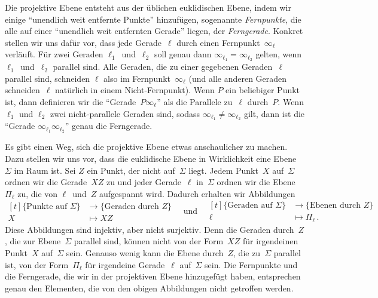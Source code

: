 Die projektive Ebene entsteht aus der üblichen euklidischen Ebene, indem wir einige \enquote{unendlich weit entfernte Punkte} hinzufügen, sogenannte \emph{Fernpunkte}, die alle auf einer \enquote{unendlich weit entfernten Gerade} liegen, der \emph{Ferngerade}. Konkret stellen wir uns dafür vor, dass jede Gerade~$\ell$ durch einen Fernpunkt~$\infty_\ell$ verläuft. Für zwei Geraden $\ell_1$~und~$\ell_2$ soll genau dann $\infty_{\ell_1}=\infty_{\ell_2}$ gelten, wenn $\ell_1$~und~$\ell_2$ parallel sind. Alle Geraden, die zu einer gegebenen Geraden~$\ell$ parallel sind, schneiden $\ell$ also im Fernpunkt~$\infty_\ell$ (und alle anderen Geraden schneiden~$\ell$ natürlich in einem Nicht-Fernpunkt). Wenn $P$ ein beliebiger Punkt ist, dann definieren wir die \enquote{Gerade~$P\infty_\ell$} als die Parallele zu~$\ell$ durch~$P$. Wenn $\ell_1$ und $\ell_2$ zwei nicht-parallele Geraden sind, sodass $\infty_{\ell_1}\neq \infty_{\ell_2}$ gilt, dann ist die \enquote{Gerade $\infty_{\ell_1}\infty_{\ell_2}$} genau die Ferngerade.

Es gibt einen Weg, sich die projektive Ebene etwas anschaulicher zu machen. Dazu stellen wir uns vor, dass die euklidische Ebene in Wirklichkeit eine Ebene~$\Sigma$ im Raum ist. Sei $Z$ ein Punkt, der nicht auf~$\Sigma$ liegt. Jedem Punkt~$X$ auf~$\Sigma$ ordnen wir die Gerade~$XZ$ zu und jeder Gerade~$\ell$ in~$\Sigma$ ordnen wir die Ebene~$\Pi_\ell$ zu, die von $\ell$~und~$Z$ aufgespannt wird. Dadurch erhalten wir Abbildungen	
\begin{equation*}
	\begin{aligned}[t]
		\{\text{Punkte auf~$\Sigma$}\}&\longrightarrow \{\text{Geraden durch~$Z$}\}\\
		X&\longmapsto XZ
	\end{aligned}\quad\text{und}\quad 
	\begin{aligned}[t]
		\{\text{Geraden auf~$\Sigma$}\} & \longrightarrow \{\text{Ebenen durch~$Z$}\}\\
		\ell & \longmapsto \Pi_\ell\,.
	\end{aligned}
\end{equation*}
Diese Abbildungen sind injektiv, aber nicht surjektiv. Denn die Geraden durch~$Z$, die zur Ebene~$\Sigma$ parallel sind, können nicht von der Form~$XZ$ für irgendeinen Punkt~$X$ auf~$\Sigma$ sein. Genauso wenig kann die Ebene durch~$Z$, die zu~$\Sigma$ parallel ist, von der Form~$\Pi_\ell$ für irgendeine Gerade~$\ell$ auf~$\Sigma$ sein. Die Fernpunkte und die Ferngerade, die wir in der projektiven Ebene hinzugefügt haben, entsprechen genau den Elementen, die von den obigen Abbildungen nicht getroffen werden.

